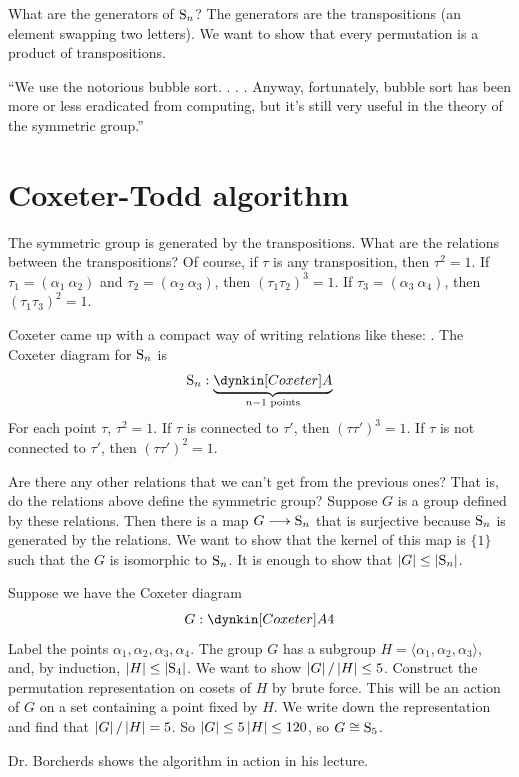 \documentclass[11pt, oneside]{amsart}
\begin{document}
What are the generators of $\operatorname{S}_n$? The generators are the transpositions (an element swapping two letters). We want to show that every permutation is a product of transpositions. 

``We use the notorious bubble sort. . . . Anyway, fortunately, bubble sort has been more or less eradicated from computing, but it's still very useful in the theory of the symmetric group.''

\section{Coxeter-Todd algorithm}
The symmetric group is generated by the transpositions. What are the relations between the transpositions? Of course, if $\tau$ is any transposition, then $\tau^2 = 1$. If $\tau_1 = (\alpha_1\  \alpha_2)$ and $\tau_2 = (\alpha_2\ \alpha_3)$, then $(\tau_1\tau_2)^3=1$. If $\tau_3 = (\alpha_3\ \alpha_4)$, then $(\tau_1\tau_3)^2=1$.

Coxeter came up with a compact way of writing relations like these: . The Coxeter diagram for $\operatorname{S}_n$ is 
$$
\Sg_n : \underbrace{\dynkin [Coxeter]A{}}_{n-1 \textrm{ points}}
$$
For each point $\tau$, $\tau^2=1$. If $\tau$ is connected to $\tau'$, then $(\tau\tau')^3 = 1$. If $\tau$ is not connected to $\tau'$, then $(\tau\tau')^2=1$.

Are there any other relations that we can't get from the previous ones? That is, do the relations above define the symmetric group? Suppose $G$ is a group defined by these relations. Then there is a map $G\longrightarrow \operatorname{S}_n$ that is surjective because $\operatorname{S}_n$ is generated by the relations. We want to show that the kernel of this map is $\{1\}$ such that the $G$ is isomorphic to $\operatorname{S}_n$. It is enough to show that $\left \lvert G \right \rvert \le \left \lvert \operatorname{S}_n \right \rvert$. 

Suppose we have the Coxeter diagram
$$
G : \dynkin [Coxeter]A{4}
$$
Label the points $\alpha_1,\alpha_2,\alpha_3,\alpha_4$. The group $G$ has a subgroup $H=\langle \alpha_1,\alpha_2,\alpha_3\rangle$, and, by induction, $\left \lvert H \right \rvert \le \left \lvert \operatorname{S}_4 \right \rvert$. We want to show $\left \lvert G \right \rvert / \left \lvert H \right \rvert \le 5$. Construct the permutation representation on cosets of $H$ by brute force. This will be an action of $G$ on a set containing a point fixed by $H$. We write down the representation and find that $\left \lvert G \right \rvert / \left \lvert H \right \rvert = 5$. So $\left \lvert G \right \rvert \le 5\left \lvert H \right \rvert \le 120$, so $G\cong \operatorname{S}_5$.

Dr. Borcherds shows the algorithm in action in his lecture.
\end{document}
